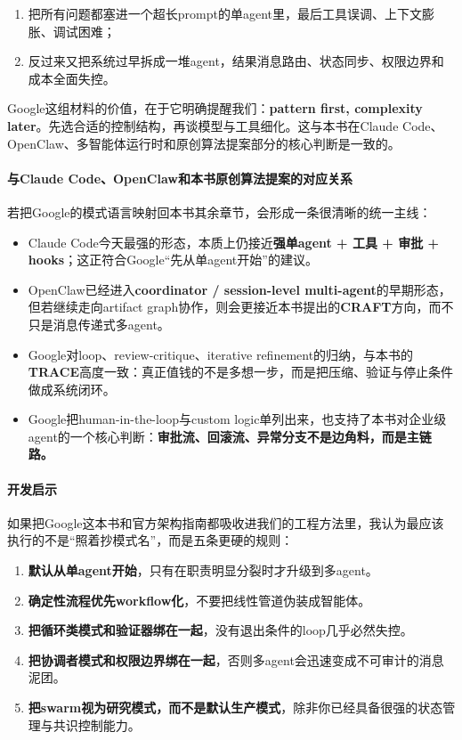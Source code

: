 \documentclass[12pt,a4paper]{article}
\begin{document}
\begin{enumerate}
    \item 把所有问题都塞进一个超长prompt的单agent里，最后工具误调、上下文膨胀、调试困难；
    \item 反过来又把系统过早拆成一堆agent，结果消息路由、状态同步、权限边界和成本全面失控。
\end{enumerate}

Google这组材料的价值，在于它明确提醒我们：\textbf{pattern first, complexity later}。先选合适的控制结构，再谈模型与工具细化。这与本书在Claude Code、OpenClaw、多智能体运行时和原创算法提案部分的核心判断是一致的。

\paragraph{与Claude Code、OpenClaw和本书原创算法提案的对应关系}

若把Google的模式语言映射回本书其余章节，会形成一条很清晰的统一主线：

\begin{itemize}
    \item Claude Code今天最强的形态，本质上仍接近\textbf{强单agent + 工具 + 审批 + hooks}；这正符合Google“先从单agent开始”的建议。
    \item OpenClaw已经进入\textbf{coordinator / session-level multi-agent}的早期形态，但若继续走向artifact graph协作，则会更接近本书提出的\textbf{CRAFT}方向，而不只是消息传递式多agent。
    \item Google对loop、review-critique、iterative refinement的归纳，与本书的\textbf{TRACE}高度一致：真正值钱的不是多想一步，而是把压缩、验证与停止条件做成系统闭环。
    \item Google把human-in-the-loop与custom logic单列出来，也支持了本书对企业级agent的一个核心判断：\textbf{审批流、回滚流、异常分支不是边角料，而是主链路。}
\end{itemize}

\paragraph{开发启示}

如果把Google这本书和官方架构指南都吸收进我们的工程方法里，我认为最应该执行的不是“照着抄模式名”，而是五条更硬的规则：

\begin{enumerate}
    \item \textbf{默认从单agent开始}，只有在职责明显分裂时才升级到多agent。
    \item \textbf{确定性流程优先workflow化}，不要把线性管道伪装成智能体。
    \item \textbf{把循环类模式和验证器绑在一起}，没有退出条件的loop几乎必然失控。
    \item \textbf{把协调者模式和权限边界绑在一起}，否则多agent会迅速变成不可审计的消息泥团。
    \item \textbf{把swarm视为研究模式，而不是默认生产模式}，除非你已经具备很强的状态管理与共识控制能力。
\end{enumerate}
\end{document}
